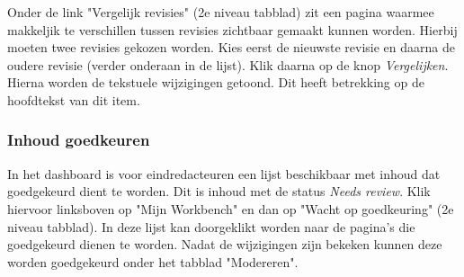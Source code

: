 Onder de link "Vergelijk revisies" (2e niveau tabblad) zit een pagina waarmee makkeljik te verschillen tussen revisies zichtbaar gemaakt kunnen worden. Hierbij moeten twee revisies gekozen worden. Kies eerst de nieuwste revisie en daarna de oudere revisie (verder onderaan in de lijst). Klik daarna op de knop \emph{Vergelijken}. Hierna worden de tekstuele wijzigingen getoond. Dit heeft betrekking op de hoofdtekst van dit item.

\subsubsection{Inhoud goedkeuren}

In het dashboard is voor eindredacteuren een lijst beschikbaar met inhoud dat goedgekeurd dient te worden. Dit is inhoud met de status \emph{Needs review}. Klik hiervoor linksboven op "Mijn Workbench" en dan op "Wacht op goedkeuring" (2e niveau tabblad). In deze lijst kan doorgeklikt worden naar de pagina's die goedgekeurd dienen te worden. Nadat de wijzigingen zijn bekeken kunnen deze worden goedgekeurd onder het tabblad "Modereren".